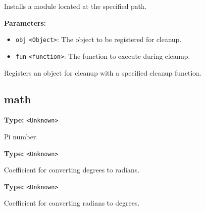 \documentclass[12pt,a4paper]{article}
\begin{document}
\noindent Installs a module located at the specified path.

\vspace{5mm}
\noindent {}


\noindent \textbf{Parameters:}
\begin{itemize}
  \item \texttt{obj} \texttt{<Object>}: The object to be registered for cleanup.
  \item \texttt{fun} \texttt{<function>}: The function to execute during cleanup.
\end{itemize}

\noindent Registers an object for cleanup with a specified cleanup function.


\subsection{math}
\vspace{5mm}
\noindent {}\vspace{4mm}


\noindent \textbf{Type:} \texttt{<Unknown>}

\noindent Pi number.

\vspace{5mm}
\noindent {}\vspace{4mm}


\noindent \textbf{Type:} \texttt{<Unknown>}

\noindent Coefficient for converting degrees to radians.

\vspace{5mm}
\noindent {}\vspace{4mm}


\noindent \textbf{Type:} \texttt{<Unknown>}

\noindent Coefficient for converting radians to degrees.

\vspace{5mm}
\noindent {}\vspace{4mm}
\end{document}
